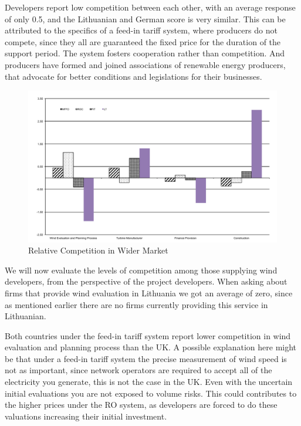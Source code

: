 \documentclass[a4paper, 12pt]{article}
\begin{document}
Developers report low competition between each other, with an average response of only 0.5, and the Lithuanian and German score is very similar. This can be attributed to the specifics of a feed-in tariff system, where producers do not compete, since they all are guaranteed the fixed price for the duration of the support period. The system fosters cooperation rather than competition. And producers have formed and joined associations of renewable energy producers, that advocate for better conditions and legislations for their businesses. 

\begin{figure}
	\centering
	\includegraphics[width=1\textwidth]{fig_survey_suppliers}
	\caption{Relative Competition in Wider Market}
	\label{fig:fig_survey_suppliers}
\end{figure}

We will now evaluate the levels of competition among those supplying wind developers, from the perspective of the project developers. When asking about firms that provide wind evaluation in Lithuania we got an average of zero, since as mentioned earlier there are no firms currently providing this service in Lithuanian. 

Both countries under the feed-in tariff system report lower competition in wind evaluation and planning process than the UK. A possible explanation here might be that under a feed-in tariff system the precise measurement of wind speed is not as important, since network operators are required to accept all of the electricity you generate, this is not the case in the UK. Even with the uncertain initial evaluations you are not exposed to volume risks. This could contributes to the higher prices under the RO system, as developers are forced to do these valuations increasing their initial investment.
\end{document}
